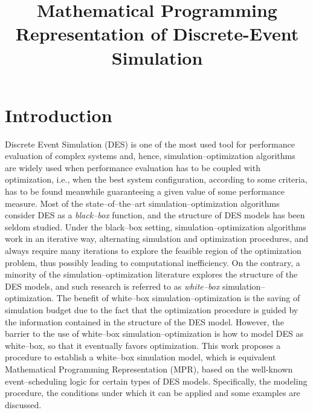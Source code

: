 \documentclass[]{interact}
\theoremstyle{plain}%
\theoremstyle{definition}
\theoremstyle{remark}
\begin{document}

\title{Mathematical Programming Representation of Discrete-Event Simulation}
\maketitle
\begin{abstract}

\end{abstract}

\section{Introduction}
Discrete Event Simulation (DES) is one of the most used tool for performance evaluation of %
complex systems and, hence, simulation--optimization algorithms are widely used %
when performance evaluation has to be coupled with optimization, i.e., when the best system configuration, according to some criteria, has to be found meanwhile guaranteeing a given value of some performance measure.  
Most of the state--of--the--art simulation--optimization algorithms consider DES as a \textit{black--box} function, and the structure of DES models has been seldom studied. Under the black--box setting, simulation--optimization algorithms work in an iterative way, alternating simulation and optimization procedures, and always require %
many iterations to explore the %
feasible region of the optimization problem, %
thus possibly leading to %
computational inefficiency.
On the contrary, a minority of the simulation--optimization literature explores the structure of the DES models, and %
such research is referred to as \textit{white--box} simulation--optimization. The benefit of white--box simulation--optimization is the saving of simulation budget due to the fact that %
the optimization procedure is guided by the information contained in the structure of the DES model. However, the barrier to the use of white--box simulation--optimization is how to model DES as white--box, so that it eventually favors optimization. This work proposes a procedure to establish a white--box simulation model, which is equivalent Mathematical Programming Representation (MPR), based on the well-known event--scheduling logic for certain types of DES models. 
Specifically, the modeling procedure, the conditions under which it can be applied and some examples are discussed. 
\end{document}

